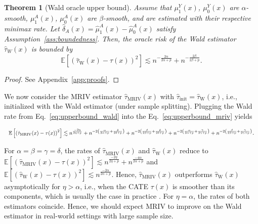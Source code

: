 \documentclass{article} %
\newcommand{\E}{\mathbb{E}}
\newcommand{\frameworkname}{MRIV\xspace}
\theoremstyle{definition}
\theoremstyle{plain}
\newtheorem{theorem}{Theorem}
\begin{document}
\begin{theorem}[Wald oracle upper bound]\label{thrm:rate_wald}
Assume that $\mu_1^Y(x)$, $\mu_0^Y(x)$ are $\alpha$-smooth, $\mu_1^A(x)$, $\mu_0^A(x)$ are $\beta$-smooth, and are estimated with their respective minimax rate. Let $\hat{\delta}_A(x) = \hat{\mu}_1^A(x) - \hat{\mu}_0^A(x)$ satisfy Assumption~\ref{ass:boundedness}. Then, the oracle risk of the Wald estimator $\hat{\tau}_W(x)$ is bounded by
\begin{equation}\label{eq:upperbound_wald}
    \E\left[(\hat{\tau}_{\mathrm{W}}(x) - \tau(x))^2\right] \lesssim  n^{-\frac{2\alpha}{2\alpha+p}} + n^{-\frac{2\beta}{2\beta+p}}.
\end{equation}
\end{theorem}
\begin{proof}
See Appendix~\ref*{app:proofs}.
\end{proof}
\vspace{-0.3cm}
We now consider the \frameworkname estimator $\hat{\tau}_{\mathrm{MRIV}}(x)$ with $\hat{\tau}_{\mathrm{init}} = \hat{\tau}_{\mathrm{W}}(x)$, i.e., initialized with the Wald estimator (under sample splitting). Plugging the Wald rate from Eq.~\eqref{eq:upperbound_wald} into the Eq.~\eqref{eq:upperbound_mriv} yields

\vspace{-0.6cm}
\begin{equation*}
    \resizebox{\hsize}{!}{$\E\left[\left(\hat{\tau}_{\mathrm{MRIV}}(x) - \tau(x)\right)^2\right] \lesssim n^{\frac{-2\eta}{2\eta+p}} +
    n^{-2\left(\frac{\alpha}{2\alpha+p}+\frac{\delta}{2\delta+p}\right)} +
    n^{-2\left(\frac{\beta}{2\beta+p}+\frac{\delta}{2\delta+p}\right)} +
    n^{-2\left(\frac{\alpha}{2\alpha+p}+\frac{\gamma}{2\gamma+p}\right)} +
    n^{-2\left(\frac{\beta}{2\beta+p}+\frac{\gamma}{2\gamma+p}\right)}$}.
\end{equation*}

\vspace{-0.5cm}

For $\alpha = \beta = \gamma = \delta$, the rates of $\hat{\tau}_{\mathrm{MRIV}}(x)$ and $\hat{\tau}_{\mathrm{W}}(x)$ reduce to $\E\left[\left(\hat{\tau}_{\mathrm{MRIV}}(x) - \tau(x)\right)^2\right] \lesssim n^{\frac{-2\eta}{2\eta+p}} +
    n^{\frac{-4\alpha}{2\alpha+p}}$ and $\E\left[\left(\hat{\tau}_{\mathrm{W}}(x) - \tau(x)\right)^2\right] \lesssim 
    n^{\frac{-2\alpha}{2\alpha+p}}$.
Hence, $\hat{\tau}_{\mathrm{MRIV}}(x)$ outperforms $\hat{\tau}_{\mathrm{W}}(x)$ asymptotically for $\eta > \alpha$, i.e., when the CATE $\tau(x)$ is smoother than its components, which is usually the case in practice \citep{Kunzel.2019}. For $\eta = \alpha$, the rates of both estimators coincide. Hence, we should expect MRIV to improve on the Wald estimator in real-world settings with large sample size.
\end{document}
